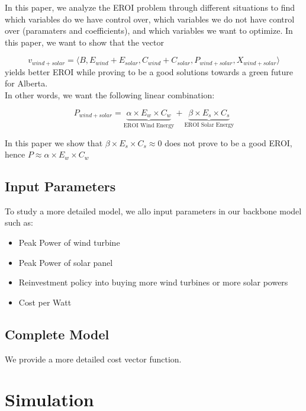 \documentclass[12pt]{article}
\begin{document}
In this paper, we analyze the EROI problem through different situations to find which variables do we have control over, which variables we do not have control over (paramaters and coefficients), and which variables we want to optimize. In this paper, we want to show that the vector 

\begin{displaymath}
v_{wind+solar}= \langle B, E_{wind} + E_{solar}, C_{wind} + C_{solar}, P_{wind + solar}, X_{wind+solar}\rangle
\end{displaymath}
 yields better EROI while proving to be a good solutions towards a green future for Alberta. \\

In other words, we want the following linear combination:

\begin{displaymath}
P_{wind+solar} = \underbrace{\alpha \times E_w \times C_w}_\text{EROI Wind Energy} + \underbrace{ \beta \times E_s \times C_s}_\text{EROI Solar Energy}
\end{displaymath}

In this paper we show that $\beta \times E_s \times C_s \approx 0$ does not prove to be a good EROI, hence $P \approx \alpha \times E_w \times C_w $\\

\subsection{Input Parameters}

To study a more detailed model, we allo input parameters in our backbone model such as:
\begin{itemize}
\item Peak Power of wind turbine
\item Peak Power of solar panel
\item Reinvestment policy into buying more wind turbines or more solar powers
\item Cost per Watt
\end{itemize}

\subsection{Complete Model}

We provide a more detailed cost vector function. 

\section{Simulation}
\end{document}
